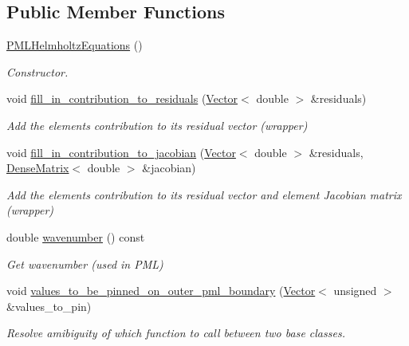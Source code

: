 \subsection*{Public Member Functions}
\begin{DoxyCompactItemize}
\item 
\hyperlink{classoomph_1_1PMLHelmholtzEquations_a24ff8c74ff7cc36ff5ecca0dbd60cb9e}{P\+M\+L\+Helmholtz\+Equations} ()
\begin{DoxyCompactList}\small\item\em Constructor. \end{DoxyCompactList}\item 
void \hyperlink{classoomph_1_1PMLHelmholtzEquations_a4dec73b82e1218743faf077447a1b48d}{fill\+\_\+in\+\_\+contribution\+\_\+to\+\_\+residuals} (\hyperlink{classoomph_1_1Vector}{Vector}$<$ double $>$ \&residuals)
\begin{DoxyCompactList}\small\item\em Add the element\textquotesingle{}s contribution to its residual vector (wrapper) \end{DoxyCompactList}\item 
void \hyperlink{classoomph_1_1PMLHelmholtzEquations_a93c2495dc0dd513b51ef77b2e3a7020a}{fill\+\_\+in\+\_\+contribution\+\_\+to\+\_\+jacobian} (\hyperlink{classoomph_1_1Vector}{Vector}$<$ double $>$ \&residuals, \hyperlink{classoomph_1_1DenseMatrix}{Dense\+Matrix}$<$ double $>$ \&jacobian)
\begin{DoxyCompactList}\small\item\em Add the element\textquotesingle{}s contribution to its residual vector and element Jacobian matrix (wrapper) \end{DoxyCompactList}\item 
double \hyperlink{classoomph_1_1PMLHelmholtzEquations_a4d0d8d6e63e7e009948c17eaf829bfdb}{wavenumber} () const
\begin{DoxyCompactList}\small\item\em Get wavenumber (used in P\+ML) \end{DoxyCompactList}\item 
void \hyperlink{classoomph_1_1PMLHelmholtzEquations_af54422c30ac706500ac5ea8585bc70f5}{values\+\_\+to\+\_\+be\+\_\+pinned\+\_\+on\+\_\+outer\+\_\+pml\+\_\+boundary} (\hyperlink{classoomph_1_1Vector}{Vector}$<$ unsigned $>$ \&values\+\_\+to\+\_\+pin)
\begin{DoxyCompactList}\small\item\em Resolve amibiguity of which function to call between two base classes. \end{DoxyCompactList}\end{DoxyCompactItemize}
